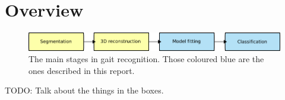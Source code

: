 \section{Overview}

\begin{figure}[b]
	\centering
	\includegraphics[width=12cm]{overview.png}
	\caption{The main stages in gait recognition.
		Those coloured blue are the ones described in this report.}
	\label{OverviewBoxes}
\end{figure}

TODO: Talk about the things in the boxes.